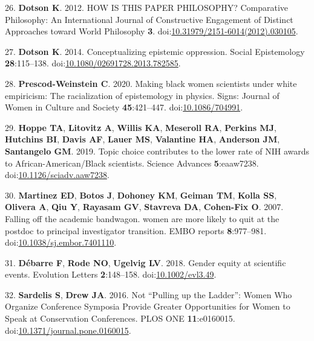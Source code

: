 \documentclass[11pt,]{article}
\begin{document}
\hypertarget{ref-Dotson2012}{}
26. \textbf{Dotson K}. 2012. HOW IS THIS PAPER PHILOSOPHY? Comparative
Philosophy: An International Journal of Constructive Engagement of
Distinct Approaches toward World Philosophy \textbf{3}.
doi:\href{https://doi.org/10.31979/2151-6014(2012).030105}{10.31979/2151-6014(2012).030105}.

\hypertarget{ref-Dotson2014}{}
27. \textbf{Dotson K}. 2014. Conceptualizing epistemic oppression.
Social Epistemology \textbf{28}:115--138.
doi:\href{https://doi.org/10.1080/02691728.2013.782585}{10.1080/02691728.2013.782585}.

\hypertarget{ref-PrescodWeinstein2020}{}
28. \textbf{Prescod-Weinstein C}. 2020. Making black women scientists
under white empiricism: The racialization of epistemology in physics.
Signs: Journal of Women in Culture and Society \textbf{45}:421--447.
doi:\href{https://doi.org/10.1086/704991}{10.1086/704991}.

\hypertarget{ref-Hoppe2019}{}
29. \textbf{Hoppe TA}, \textbf{Litovitz A}, \textbf{Willis KA},
\textbf{Meseroll RA}, \textbf{Perkins MJ}, \textbf{Hutchins BI},
\textbf{Davis AF}, \textbf{Lauer MS}, \textbf{Valantine HA},
\textbf{Anderson JM}, \textbf{Santangelo GM}. 2019. Topic choice
contributes to the lower rate of NIH awards to African-American/Black
scientists. Science Advances \textbf{5}:eaaw7238.
doi:\href{https://doi.org/10.1126/sciadv.aaw7238}{10.1126/sciadv.aaw7238}.

\hypertarget{ref-Martinez2007}{}
30. \textbf{Martinez ED}, \textbf{Botos J}, \textbf{Dohoney KM},
\textbf{Geiman TM}, \textbf{Kolla SS}, \textbf{Olivera A}, \textbf{Qiu
Y}, \textbf{Rayasam GV}, \textbf{Stavreva DA}, \textbf{Cohen-Fix O}.
2007. Falling off the academic bandwagon. women are more likely to quit
at the postdoc to principal investigator transition. EMBO reports
\textbf{8}:977--981.
doi:\href{https://doi.org/10.1038/sj.embor.7401110}{10.1038/sj.embor.7401110}.

\hypertarget{ref-debarre_gender_2018}{}
31. \textbf{Débarre F}, \textbf{Rode NO}, \textbf{Ugelvig LV}. 2018.
Gender equity at scientific events. Evolution Letters
\textbf{2}:148--158.
doi:\href{https://doi.org/10.1002/evl3.49}{10.1002/evl3.49}.

\hypertarget{ref-sardelis_not_2016}{}
32. \textbf{Sardelis S}, \textbf{Drew JA}. 2016. Not ``Pulling up the
Ladder'': Women Who Organize Conference Symposia Provide Greater
Opportunities for Women to Speak at Conservation Conferences. PLOS ONE
\textbf{11}:e0160015.
doi:\href{https://doi.org/10.1371/journal.pone.0160015}{10.1371/journal.pone.0160015}.
\end{document}
